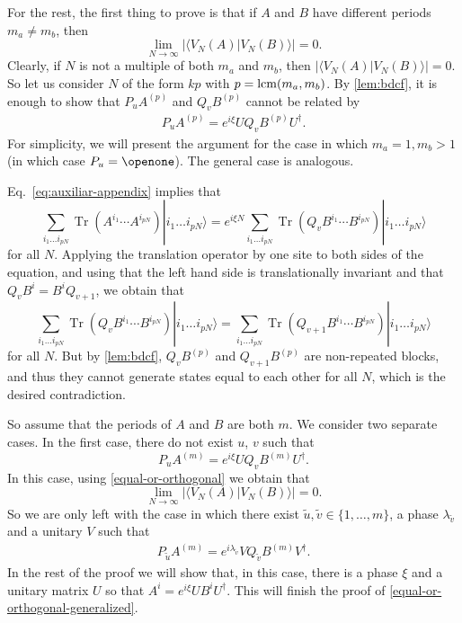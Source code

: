 \documentclass[pra,a4paper,notitlepage,nofootinbib,superscriptaddress]{revtex4-1}
\theoremstyle{plain}
\newcommand{\1}{{\openone}}
\newcommand{\be}{\begin{eqnarray}}
\newcommand{\ee}{\end{eqnarray}}
\newcommand{\ra}{\rangle}
\newcommand{\la}{\langle}
\DeclareMathOperator{\tr}{Tr}
\begin{document}
For the rest, the first thing to prove is that if $A$ and $B$ have different periods $m_a\not = m_b$, then
$$
    \lim_{N\to\infty} |\langle V_N(A)|V_N(B)\rangle|=0.
$$
Clearly, if $N$ is not a multiple of both $m_a$ and $m_b$, then $ |\la V_N(A)|V_N(B)\ra |=0$. So let us consider $N$ of the form $kp$ with $p={\rm lcm}(m_a,m_b)$.
By \cref{lem:bdcf},  it is enough to show that $P_uA^{(p)}$ and $Q_v B^{(p)}$ cannot be related by
\be
    \label{eq:auxiliar-appendix}
    P_uA^{(p)} = e^{i\xi }U Q_{v} B^{(p)}U^{\dagger} .
\ee
For simplicity, we will present the argument for the case in which
$m_a=1, m_b>1$ (in which case $P_u=\openone$).  The general case is  analogous.

Eq.\ \eqref{eq:auxiliar-appendix} implies that
$$
    \sum_{i_1\ldots i_{pN}}
    \tr(A^{i_1}\cdots A^{i_{pN}} ) |i_1\ldots i_{pN}\ra  =e^{i\xi N}
    \sum_{i_1\ldots i_{pN}}
    \tr(Q_{v} B^{i_1}\cdots B^{i_{pN}} ) |i_1\ldots i_{pN}\ra
$$
for all $N$.
Applying the translation operator by one site to both sides of the equation,
and using that the left hand side is translationally invariant and that $Q_{v}B^i = B^i Q_{v+1}$,
we obtain that
$$
    \sum_{i_1\ldots i_{pN}}
    \tr(Q_{v} B^{i_1}\cdots B^{i_{pN}} ) |i_1\ldots i_{pN}\ra   =
    \sum_{i_1\ldots i_{pN}}
    \tr(Q_{v+1} B^{i_1}\cdots B^{i_{pN}} ) |i_1\ldots i_{pN}\ra
$$
for all $N$.
But by \cref{lem:bdcf}, $Q_{v} B^{(p)}$ and
$Q_{v+1} B^{(p)}$ are non-repeated blocks,
and thus they cannot generate states equal to each other for all $N$, which is the desired contradiction.

So assume that the periods of $A$ and $B$ are both $m$. We consider two
separate cases. In the first case, there do not exist $u$, $v$ such that
$$
    P_uA^{(m)} = e^{i\xi }U Q_{v} B^{(m)}U^{\dagger} .
$$
In this case, using \cref{equal-or-orthogonal} we obtain that
$$
    \lim_{N\to\infty} |\la V_N(A)|V_N(B)\ra |=0.
$$
So we are only left with the case in which there exist $\tilde u,\tilde v\in
    \{1,\ldots,m\}$, a phase $\lambda_{\tilde v}$ and a unitary $V$ such that \be
    P_{\tilde u} A^{(m)}  =
    e^{i\lambda_{\tilde v}} V  Q_{\tilde v} B^{(m)}   V^{\dagger}.
    \label{eq:ABm}
\ee
In the rest of the proof we will show that, in this case,
there is a phase $\xi$
and a unitary matrix $U$ so that
$A^i = e^{i\xi} U B^i U^{\dagger}. $
This will finish the proof of \cref{equal-or-orthogonal-generalized}.
\end{document}
